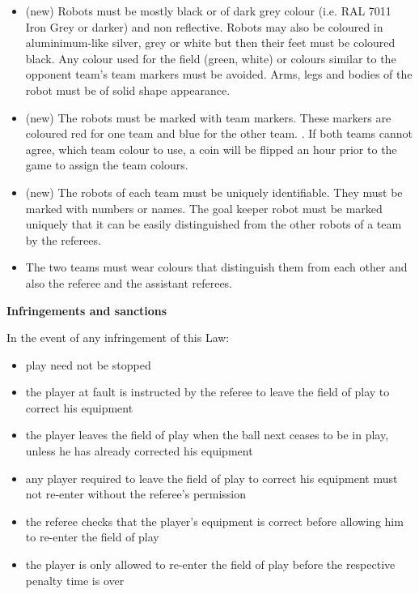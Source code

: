 \begin{itemize}
\item (new) Robots must be mostly black or of dark grey colour (i.e. RAL 7011 Iron Grey or darker) and non reflective. Robots may also be coloured in aluminimum-like silver, grey or white but then their feet must be coloured black. Any colour used for the field (green, white) or colours similar to the opponent team's team markers must be avoided. Arms, legs and bodies of the robot must be of solid shape appearance.
\item (new) The robots must be marked with team markers.
 These markers are coloured red for one team and blue for the other team.   . If both teams cannot agree, which team colour to use, a coin will be flipped an hour prior to the game to assign the team colours.
\item (new) The robots of each team must be uniquely identifiable. They must be marked with numbers or names. The goal keeper robot must be marked uniquely that it can be easily distinguished from the other robots of a team by the referees. 
\item The two teams must wear colours that distinguish them from each other and also the referee and the assistant referees.
\end{itemize}

\bigskip

{\bfseries Infringements and sanctions}

\headlinebox

In the event of any infringement of this Law:

\begin{itemize}
\item play need not be stopped
\item the player at fault is instructed by the referee to leave the field of play to correct his equipment
\item the player leaves the field of play when the ball next ceases to be in play, unless he has already corrected his equipment
\item any player required to leave the field of play to correct his equipment must not re-enter without the referee's permission
\item the referee checks that the player's equipment is correct before allowing him to re-enter the field of play 
\item the player is only allowed to re-enter the field of play before the respective penalty time is over 
\end{itemize}

